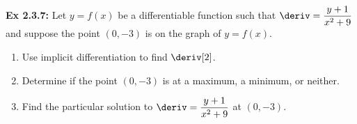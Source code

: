 \begin{tcolorbox}[example]
    \textbf{Ex 2.3.7: } Let $y = f(x)$ be a differentiable function such that $\deriv = \dfrac{y + 1}{x^2 + 9}$ and suppose the point $(0, -3)$ is on the graph of $y = f(x)$. \\
    \begin{enumerate}[label=\hspace{11pt}(\alph*), align=left, leftmargin=*, labelsep=0.25em]
        \item Use implicit differentiation to find $\deriv[2]$. \\
        \item Determine if the point $(0, -3)$ is at a maximum, a minimum, or neither. \\
        \item Find the particular solution to $\deriv = \dfrac{y + 1}{x^2 + 9}$ at $(0, -3)$. \\
    \end{enumerate}
\end{tcolorbox}
